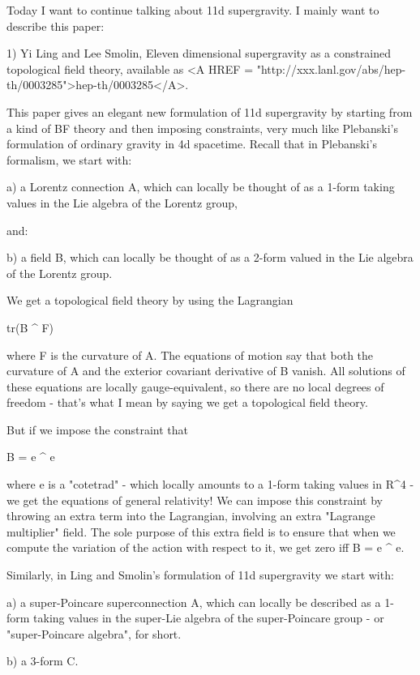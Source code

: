 


Today I want to continue talking about 11d supergravity. 
I mainly want to describe this paper:

1) Yi Ling and Lee Smolin, Eleven dimensional supergravity as a
constrained topological field theory, available as <A HREF = "http://xxx.lanl.gov/abs/hep-th/0003285">hep-th/0003285</A>.

This paper gives an elegant new formulation of 11d supergravity by
starting from a kind of BF theory and then imposing constraints,
very much like Plebanski's formulation of ordinary gravity in 4d
spacetime.  Recall that in Plebanski's formalism, we start with:

a) a Lorentz connection A, which can locally be thought of as a 
1-form taking values in the Lie algebra of the Lorentz group, 

and:

b) a field B, which can locally be thought of as a 2-form valued
in the Lie algebra of the Lorentz group.

We get a topological field theory by using the Lagrangian 

tr(B ^ F)

where F is the curvature of A.  The equations of motion say that both
the curvature of A and the exterior covariant derivative of B vanish. 
All solutions of these equations are locally gauge-equivalent, so there
are no local degrees of freedom - that's what I mean by saying we get a
topological field theory.

But if we impose the constraint that 

B = e ^ e

where e is a "cotetrad" - which locally amounts to a 1-form taking
values in R^4 - we get the equations of general relativity!  We can
impose this constraint by throwing an extra term into the Lagrangian,
involving an extra "Lagrange multiplier" field.  The sole purpose of
this extra field is to ensure that when we compute the variation of the
action with respect to it, we get zero iff B = e ^ e. 

Similarly, in Ling and Smolin's formulation of 11d supergravity we start
with:

a) a super-Poincare superconnection A, which can locally be described 
as a 1-form taking values in the super-Lie algebra of the super-Poincare
group - or "super-Poincare algebra", for short.

b) a 3-form C.

